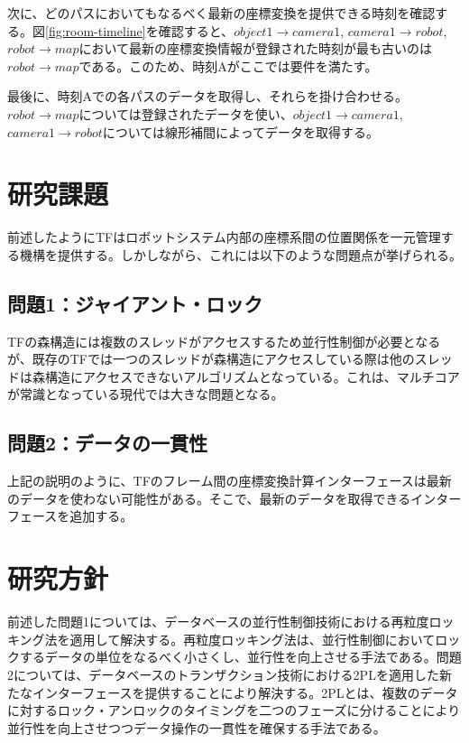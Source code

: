 \documentclass[a4paper]{jreport}	%
\begin{document}
次に、どのパスにおいてもなるべく最新の座標変換を提供できる時刻を確認する。図\ref{fig:room-timeline}を確認すると、$object1 \rightarrow camera1$, $camera1 \rightarrow robot$, $robot \rightarrow map$において最新の座標変換情報が登録された時刻が最も古いのは$robot \rightarrow map$である。このため、時刻Aがここでは要件を満たす。

最後に、時刻Aでの各パスのデータを取得し、それらを掛け合わせる。$robot \rightarrow map$については登録されたデータを使い、$object1 \rightarrow camera1$, $camera1 \rightarrow robot$については線形補間によってデータを取得する。

\section{研究課題}
前述したようにTFはロボットシステム内部の座標系間の位置関係を一元管理する機構を提供する。しかしながら、これには以下のような問題点が挙げられる。

\subsection*{問題1：ジャイアント・ロック}
TFの森構造には複数のスレッドがアクセスするため並行性制御が必要となるが、既存のTFでは一つのスレッドが森構造にアクセスしている際は他のスレッドは森構造にアクセスできないアルゴリズムとなっている。これは、マルチコアが常識となっている現代では大きな問題となる。

\subsection*{問題2：データの一貫性}

上記の説明のように、TFのフレーム間の座標変換計算インターフェースは最新のデータを使わない可能性がある。そこで、最新のデータを取得できるインターフェースを追加する。

\section{研究方針}
前述した問題1については、データベースの並行性制御技術における再粒度ロッキング法を適用して解決する。再粒度ロッキング法は、並行性制御においてロックするデータの単位をなるべく小さくし、並行性を向上させる手法である。問題2については、データベースのトランザクション技術における2PLを適用した新たなインターフェースを提供することにより解決する。2PLとは、複数のデータに対するロック・アンロックのタイミングを二つのフェーズに分けることにより並行性を向上させつつデータ操作の一貫性を確保する手法である。
\end{document}
